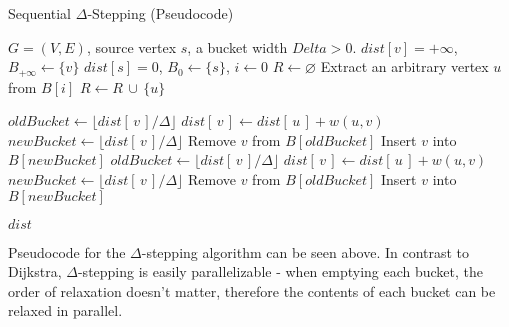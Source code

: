 \documentclass[12pt]{article}
\begin{document}
\begin{algorithm}
\caption{Sequential $\Delta$‐Stepping (Pseudocode)}
\label{alg:delta_stepping}
\begin{algorithmic}[1]
\Require 
    \(G = (V, E)\), source vertex $s$, a bucket width $Delta > 0$.
    \State $dist[v] = +\infty$, $B_{+\infty} \gets \{v\}$
\EndFor
\State $dist[s] = 0$, $B_0 \gets \{s\}$, \(i \gets 0\)  
    \State \(R \gets \varnothing\)  
        \State Extract an arbitrary vertex \(u\) from \(B[i]\)
        \State \(R \gets R \,\cup\, \{u\}\)

                \State \(\mathit{oldBucket} \gets \bigl\lfloor \mathit{dist}[\,v\,] / \Delta \bigr\rfloor\)
                \State \(\mathit{dist}[\,v\,] \gets \mathit{dist}[\,u\,] + w(u,v)\)
                \State \(\mathit{newBucket} \gets \bigl\lfloor \mathit{dist}[\,v\,] / \Delta \bigr\rfloor\)
                    \State Remove \(v\) from \(B[\mathit{oldBucket}]\) 
                \State Insert \(v\) into \(B[\mathit{newBucket}]\)
            \EndIf
        \EndFor
    \EndWhile
                \State \(\mathit{oldBucket} \gets \bigl\lfloor \mathit{dist}[\,v\,] / \Delta \bigr\rfloor\)
                \State \(\mathit{dist}[\,v\,] \gets \mathit{dist}[\,u\,] + w(u,v)\)
                \State \(\mathit{newBucket} \gets \bigl\lfloor \mathit{dist}[\,v\,] / \Delta \bigr\rfloor\)
                    \State Remove \(v\) from \(B[\mathit{oldBucket}]\)
                \State Insert \(v\) into \(B[\mathit{newBucket}]\)
            \EndIf
        \EndFor
    \EndFor
\EndWhile

\State \Return \(\mathit{dist}\)
\end{algorithmic}
\end{algorithm}

Pseudocode for the $\Delta$-stepping algorithm can be seen above. In contrast to Dijkstra, $\Delta$-stepping is easily parallelizable - when emptying each bucket, the order of relaxation doesn't matter, therefore the contents of each bucket can be relaxed in parallel. 
\end{document}
